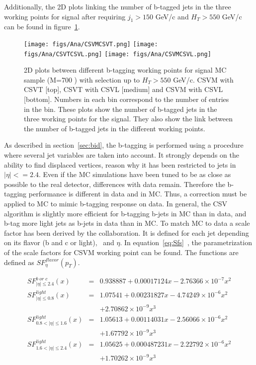 Additionally, the 2D plots linking the number of b-tagged jets in the three working points for signal after requiring $j_{1}>150$ GeV/c and $H_{T}>550$ GeV/c can be found in figure~\ref{fig:WPcorr}.

\begin{figure}[!Hhtbp]
  \begin{center}
    \texttt{[image: figs/Ana/CSVMCSVT.png]}
    \texttt{[image: figs/Ana/CSVTCSVL.png]}
    \texttt{[image: figs/Ana/CSVMCSVL.png]}
    \caption{2D plots between different b-tagging working points for signal MC sample (M=700 \GeVcc) with selection up to $H_{T}>550$ GeV/c. CSVM with CSVT [top], CSVT with CSVL [medium] and CSVM with CSVL [bottom]. Numbers in each bin correspond to the number of entries in the bin. These plots show the number of b-tagged jets in the three working points for the signal. They also show the link between the number of b-tagged jets in the different working points.}
    \label{fig:WPcorr}
  \end{center}
\end{figure}

As described in section~\ref{sec:bid}, the b-tagging is performed using a procedure where several jet variables are taken into account. It strongly depends on the ability to find displaced vertices, reason why it has been restricted to jets in $|\eta|<=2.4$. Even if the MC simulations have been tuned to be as close as possible to the real detector, differences with data remain. Therefore the b-tagging performance is different in data and in MC. Thus, a correction must be applied to MC to mimic b-tagging response on data. In general, the CSV algorithm is slightly more efficient for b-tagging b-jets in MC than in data, and b-tag more light jets as b-jets in data than in MC. To match MC to data a scale factor has been derived by the collaboration. It is defined for each jet depending on its flavor (b and c or light), \pt~and $\eta$. In equation~\ref{eq:Sfs}~\cite{CMS-PAS-BTV-13-001}, the parametrization of the scale factors for CSVM working point can be found. The functions are defined as $SF^{flavor}_{\eta}(p_{T})$.

\begin{eqnarray}
  \label{eq:Sfs}
  SF^{b\; or\; c}_{|\eta|\le 2.4}(x) & = & 0.938887 + 0.00017124x - 2.76366 \times 10^{-7}x^{2} \nonumber \\
  SF^{light}_{|\eta|\le 0.8}(x) & = & 1.07541 + 0.00231827x - 4.74249 \times 10^{-6}x^{2}  \nonumber \\
  &  & +2.70862 \times 10^{-9}x^{3} \nonumber \\
  SF^{light}_{0.8 < |\eta|\le 1.6}(x) & = & 1.05613 + 0.00114031x - 2.56066 \times 10^{-6}x^{2} \nonumber \\
  &  & + 1.67792 \times 10^{-9}x^{3} \nonumber \\
  SF^{light}_{1.6 < |\eta|\le 2.4}(x) & = & 1.05625 + 0.000487231x - 2.22792 \times 10^{-6}x^{2} \nonumber \\
  &  & + 1.70262 \times 10^{-9}x^{3}
\end{eqnarray}

